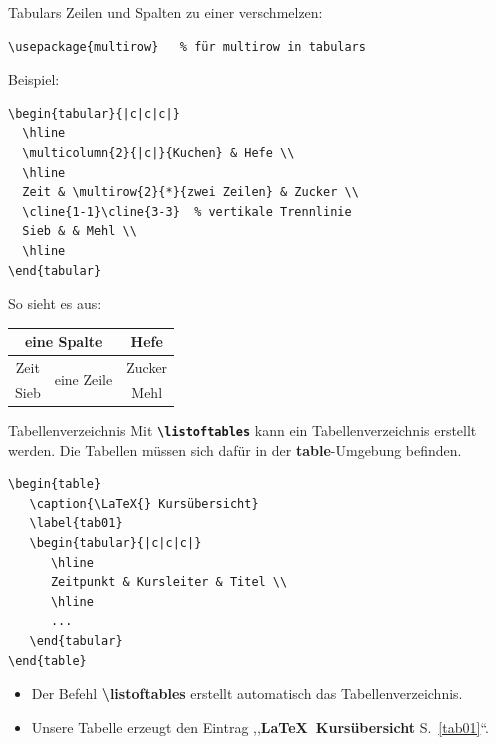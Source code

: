 \begin{frame}[fragile]{Tabulars}
Zeilen und Spalten zu einer verschmelzen:

\begin{lstlisting}[style=tex]
\usepackage{multirow}   % für multirow in tabulars
\end{lstlisting}%

Beispiel:
\begin{lstlisting}[style=tex]
\begin{tabular}{|c|c|c|}
  \hline
  \multicolumn{2}{|c|}{Kuchen} & Hefe \\
  \hline
  Zeit & \multirow{2}{*}{zwei Zeilen} & Zucker \\
  \cline{1-1}\cline{3-3}  % vertikale Trennlinie
  Sieb & & Mehl \\
  \hline
\end{tabular}
\end{lstlisting}

So sieht es aus:
\renewcommand{\arraystretch}{1.2}
\begin{tabular}{|c|c|c|}
\hline
\multicolumn{2}{|c|}{eine Spalte} & Hefe \\
\hline
Zeit & \multirow{2}{*}{eine Zeile} & Zucker \\
\cline{1-1}\cline{3-3}
Sieb & & Mehl \\
\hline
\end{tabular}
\end{frame}

\begin{frame}[fragile]{Tabellenverzeichnis}
Mit \textbf{\texttt{\textbackslash listoftables}} kann ein Tabellenverzeichnis erstellt werden.
Die Tabellen müssen sich dafür in der \textbf{table}-Umgebung befinden.

\begin{lstlisting}[style=tex]
\begin{table}
   \caption{\LaTeX{} Kursübersicht}
   \label{tab01}
   \begin{tabular}{|c|c|c|}
      \hline
      Zeitpunkt & Kursleiter & Titel \\
      \hline 
      ...   
   \end{tabular}
\end{table}
\end{lstlisting}\label{tab01}%

\begin{itemize}
\item Der Befehl \textbf{\textbackslash listoftables} erstellt automatisch das Tabellenverzeichnis.
\item Unsere Tabelle erzeugt den Eintrag ,,\textbf{\LaTeX{}~Kursübersicht} S.~\ref{tab01}``.
\end{itemize}
\end{frame}

